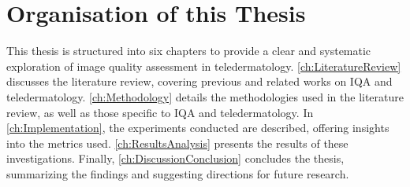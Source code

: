 \section{Organisation of this Thesis}
\label{sec:Structure}
This thesis is structured into six chapters to provide a clear and systematic exploration of image quality assessment in teledermatology. \autoref{ch:LiteratureReview} discusses the literature review, covering previous and related works on IQA and teledermatology. \autoref{ch:Methodology} details the methodologies used in the literature review, as well as those specific to IQA and teledermatology. In \autoref{ch:Implementation}, the experiments conducted are described, offering insights into the metrics used. \autoref{ch:ResultsAnalysis} presents the results of these investigations. Finally, \autoref{ch:DiscussionConclusion} concludes the thesis, summarizing the findings and suggesting directions for future research. \par